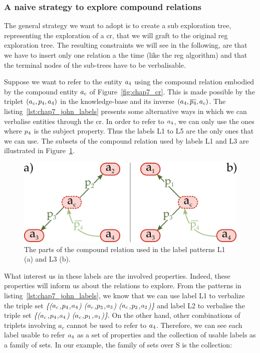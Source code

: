\subsubsection{A naive strategy to explore compound relations}

The general strategy we want to adopt is to create a sub exploration tree, representing the exploration of a \acrshort{cr}, that we will graft to the original \acrshort{reg} exploration tree. The resulting constraints we will see in the following, are that we have to insert only one relation a the time (like the \acrshort{reg} algorithm) and that the terminal nodes of the sub-trees have to be verbalisable.

Suppose we want to refer to the entity $a_4$ using the compound relation embodied by the compound entity $a_c$ of Figure~\ref{fig:chap7_cr}. This is made possible by the triplet $(a_c,p_4,a_4)$ in the knowledge-base and its inverse $(a_4, \overline{p_4}, a_c)$. The listing~\ref{lst:chap7_john_labels} presents some alternative ways in which we can verbalise entities through the \acrshort{cr}. In order to refer to $a_4$, we can only use the ones where $p_4$ is the subject property. Thus the labels L1 to L5 are the only ones that we can use. The subsets of the compound relation used by labels L1 and L3 are illustrated in Figure~\ref{fig:chap7_cr_part}.

\begin{figure}[ht!]
\centering
\includegraphics[scale=0.4]{figures/chapter7/CR_part.png}
\caption{\label{fig:chap7_cr_part} The parts of the compound relation used in the label patterns L1 (a) and L3 (b).}
\end{figure}

What interest us in these labels are the involved properties. Indeed, these properties will inform us about the relations to explore. From the patterns in listing~\ref{lst:chap7_john_labels}, we know that we can use label L1 to verbalize the triple set \textit{\{($a_c$,$p_4$,$a_4$) ($a_c$,$p_3$,$a_3$) ($a_c$,$p_2$,$a_2$)\}} and label L2 to verbalise the triple set \textit{\{($a_c$,$p_4$,$a_4$) ($a_c$,$p_1$,$a_1$)\}}. On the other hand, other combinations of triplets involving $a_c$ cannot be used to refer to $a_4$. Therefore, we can see each label usable to refer $a_4$ as a set of properties and the collection of usable labels as a family of sets. In our example, the family of sets over S is the collection:

